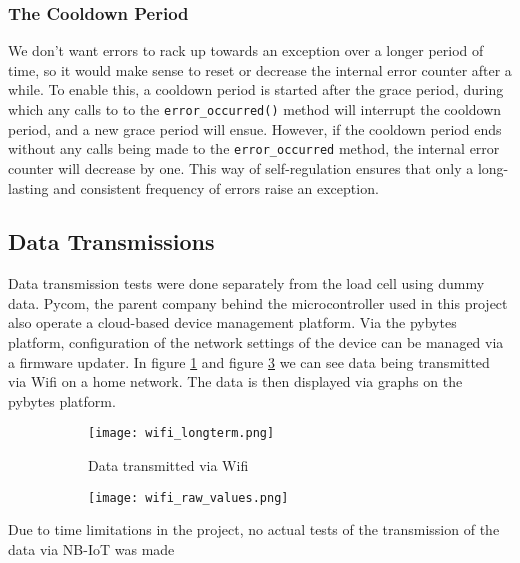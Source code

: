 \subsubsection{The Cooldown Period}
We don't want errors to rack up towards an exception over a longer period of time, so it would make sense to reset or decrease the internal error counter after a while. To enable this, a cooldown period is started after the grace period, during which any calls to to the \lstinline{error_occurred()} method will interrupt the cooldown period, and a new grace period will ensue. However, if the cooldown period ends without any calls being made to the \lstinline{error_occurred} method, the internal error counter will decrease by one. This way of self-regulation ensures that only a long-lasting and consistent frequency of errors raise an exception.


\subsection{Data Transmissions}
Data transmission tests were done separately from the load cell using dummy data. Pycom, the parent company behind the microcontroller used in this project also operate a cloud-based device management platform. \cite{pybytes-website} Via the pybytes platform, configuration of the network settings of the device can be managed via a firmware updater. 
In figure \ref{fig:wifi_longterm} and figure \ref{fig:wifi_raw_values} we can see data being transmitted via Wifi on a home network. The data is then displayed via graphs on the pybytes platform.

\begin{figure}[H]
\centering
	\begin{subfigure}[b]{0.3\textwidth}
    \texttt{[image: wifi\_longterm.png]}
    \caption{Data transmitted via Wifi}
    \label{fig:wifi_longterm}
	\end{subfigure}
	\begin{subfigure}[b]{0.3\textwidth}
    \texttt{[image: wifi\_raw\_values.png]}
    \caption{}
    \label{fig:wifi_raw_values}
	\end{subfigure}
\end{figure}

Due to time limitations in the project, no actual tests of the transmission of the data via NB-IoT was made 
